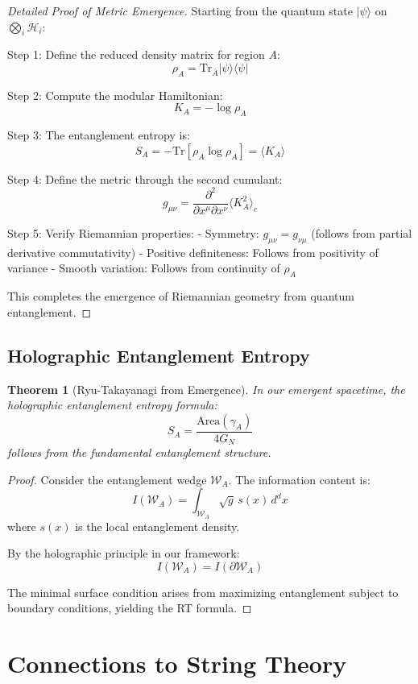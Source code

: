 \documentclass[12pt,a4paper]{article}
\newcommand{\Hilb}{\mathcal{H}}
\newcommand{\Tr}{\mathrm{Tr}}
\theoremstyle{plain}
\newtheorem{theorem}{Theorem}[section]
\theoremstyle{definition}
\theoremstyle{remark}
\begin{document}
\begin{proof}[Detailed Proof of Metric Emergence]
Starting from the quantum state $|\psi\rangle$ on $\bigotimes_i \Hilb_i$:

Step 1: Define the reduced density matrix for region $A$:
\[\rho_A = \Tr_{\bar{A}}|\psi\rangle\langle\psi|\]

Step 2: Compute the modular Hamiltonian:
\[K_A = -\log \rho_A\]

Step 3: The entanglement entropy is:
\[S_A = -\Tr[\rho_A \log \rho_A] = \langle K_A \rangle\]

Step 4: Define the metric through the second cumulant:
\[g_{\mu\nu} = \frac{\partial^2}{\partial x^\mu \partial x^\nu}\langle K_A^2 \rangle_c\]

Step 5: Verify Riemannian properties:
- Symmetry: $g_{\mu\nu} = g_{\nu\mu}$ (follows from partial derivative commutativity)
- Positive definiteness: Follows from positivity of variance
- Smooth variation: Follows from continuity of $\rho_A$

This completes the emergence of Riemannian geometry from quantum entanglement.
\end{proof}

\subsection{Holographic Entanglement Entropy}

\begin{theorem}[Ryu-Takayanagi from Emergence]
In our emergent spacetime, the holographic entanglement entropy formula:
\[S_A = \frac{\text{Area}(\gamma_A)}{4G_N}\]
follows from the fundamental entanglement structure.
\end{theorem}

\begin{proof}
Consider the entanglement wedge $\mathcal{W}_A$. The information content is:
\[I(\mathcal{W}_A) = \int_{\mathcal{W}_A} \sqrt{g} \, s(x) \, d^dx\]
where $s(x)$ is the local entanglement density.

By the holographic principle in our framework:
\[I(\mathcal{W}_A) = I(\partial \mathcal{W}_A)\]

The minimal surface condition arises from maximizing entanglement subject to boundary conditions, yielding the RT formula.
\end{proof}

\section{Connections to String Theory}
\end{document}
